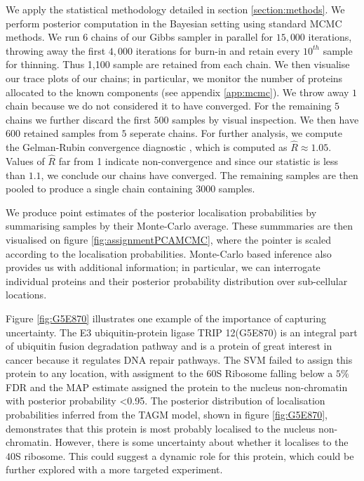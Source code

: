 \documentclass[12pt,english]{article}
\begin{document}
We apply the statistical methodology detailed in section \ref{section:methods}.
We perform posterior computation in the Bayesian setting using standard MCMC methods.
We run $6$ chains of our Gibbs sampler in parallel for $15,000$ iterations, throwing away
the first $4,000$ iterations for burn-in and retain every $10^{th}$ sample for thinning.
Thus 1,100 sample are retained from each chain. We then visualise our trace plots of our chains;
in particular, we monitor the number of proteins allocated to the known components
(see appendix \ref{app:mcmc}). We throw away $1$ chain because we do not considered it to have converged.
For the remaining $5$ chains we further discard the first $500$ samples by visual inspection.
We then have $600$ retained samples from $5$ seperate chains. For further analysis, we compute
the Gelman-Rubin convergence diagnostic \citep{Gelman:1992, Brooks:1998}, which is computed as $\hat{R} \approx 1.05$.
Values of $\hat{R}$ far from 1 indicate non-convergence and since our statistic is less than $1.1$, we conclude our chains have converged. The remaining samples are then pooled to produce a single chain containing $3000$ samples.

We produce point estimates of the posterior localisation probabilities by
summarising samples by their Monte-Carlo average.
These summmaries are then visualised on figure \ref{fig:assignmentPCAMCMC}, where the pointer is scaled
according to the localisation probabilities. Monte-Carlo based inference also provides us with
additional information; in particular, we can interrogate individual proteins and their
posterior probability distribution over sub-cellular locations.

Figure \ref{fig:G5E870} illustrates one example of the importance of capturing uncertainty.
The E3 ubiquitin-protein ligase TRIP 12(G5E870) is an integral part of ubiquitin fusion degradation
pathway and is a protein of great interest in cancer because it regulates DNA repair pathways. The SVM
failed to assign this protein to any location, with assigment to the 60S Ribosome falling below a
$5\%$ FDR and the MAP estimate assigned the protein to the nucleus non-chromatin with posterior probability <0.95.
The posterior distribution of localisation probabilities inferred from the TAGM model, shown in figure \ref{fig:G5E870},
demonstrates that this protein is most probably localised to the nucleus non-chromatin. However, there is some uncertainty about whether it localises to the $40$S ribosome.
This could suggest a dynamic role for
this protein, which could be further explored with a more targeted experiment.
\end{document}
